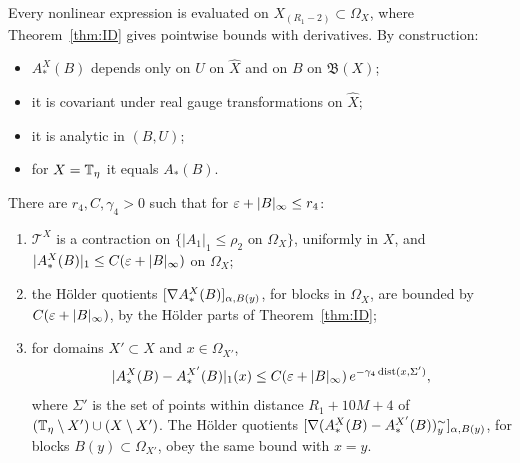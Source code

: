 Every nonlinear expression is evaluated on $X_{(R_1-2)}\subset\Omega_X$, where Theorem~\ref{thm:ID} gives pointwise bounds with derivatives. By construction:
\begin{itemize}
\item $A^X_*(B)$ depends only on $U$ on $\hat X$ and on $B$ on $\mathfrak B(X)$;
\item it is covariant under real gauge transformations on $\hat X$;
\item it is analytic in $(B,U)$;
\item for $X=\mathbb T_\eta$ it equals $A_*(B)$.
\end{itemize}

\begin{proposition}\label{prop:map-compare}
There are $r_4,C,\gamma_4>0$ such that for $\varepsilon+|B|_\infty\le r_4$:
\begin{enumerate}[label=(\alph*)]
\item $\mathcal T^X$ is a contraction on $\{|A_1|_1\le\rho_2\text{ on }\Omega_X\}$, uniformly in $X$, and $|A^X_*(B)|_1\le C(\varepsilon+|B|_\infty)$ on $\Omega_X$;
\item the H\"older quotients $[\nabla A^X_*(B)]_{\alpha,B(y)}$, for blocks in $\Omega_X$, are bounded by $C(\varepsilon+|B|_\infty)$, by the H\"older parts of Theorem~\ref{thm:ID};
\item for domains $X'\subset X$ and $x\in\Omega_{X'}$,
\[
|A^X_*(B)-A^{X'}_*(B)|_1(x)\le C(\varepsilon+|B|_\infty)\,e^{-\gamma_4\operatorname{dist}(x,\Sigma')},
\]
where $\Sigma'$ is the set of points within distance $R_1+10M+4$ of $(\mathbb T_\eta\setminus X')\cup(X\setminus X')$. The H\"older quotients $[\nabla(A^X_*(B)-A^{X'}_*(B))^\sim_y]_{\alpha,B(y)}$, for blocks $B(y)\subset\Omega_{X'}$, obey the same bound with $x=y$.
\end{enumerate}
\end{proposition}

